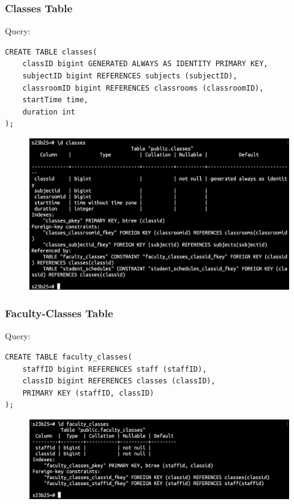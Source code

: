 \documentclass{article}
\begin{document}
\subsubsection*{Classes Table}
Query:
\begin{Verbatim}[frame=single,framerule=1pt,fontfamily=courier,fontsize=\small]
CREATE TABLE classes(
    classID bigint GENERATED ALWAYS AS IDENTITY PRIMARY KEY,
    subjectID bigint REFERENCES subjects (subjectID),
    classroomID bigint REFERENCES classrooms (classroomID),
    startTime time,
    duration int
);
\end{Verbatim}
\begin{figure}[h]
    \centering
    \includegraphics[width=\textwidth]{./o_9_classes.png}
\end{figure}

\subsubsection*{Faculty-Classes Table}
Query:
\begin{Verbatim}[frame=single,framerule=1pt,fontfamily=courier,fontsize=\small]
CREATE TABLE faculty_classes(
    staffID bigint REFERENCES staff (staffID),
    classID bigint REFERENCES classes (classID),
    PRIMARY KEY (staffID, classID)
);
\end{Verbatim}
\begin{figure}[h]
    \centering
    \includegraphics[width=\textwidth]{./o_10_faculty_classes.png}
\end{figure}
\end{document}
